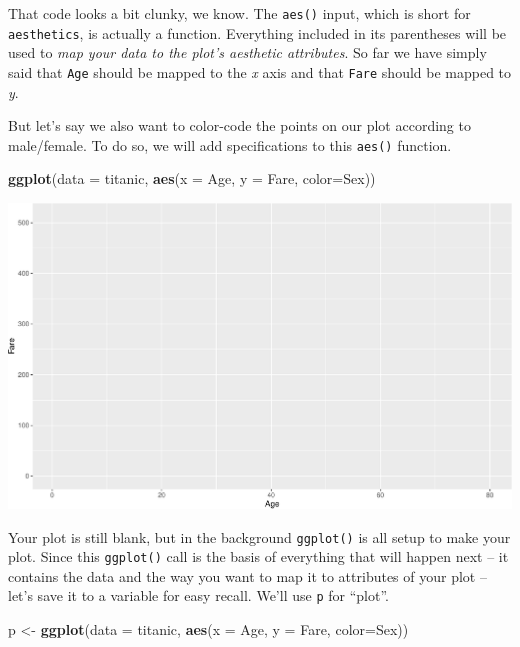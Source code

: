 \documentclass[]{book}
\newenvironment{Shaded}{\begin{snugshade}}{\end{snugshade}}
\newcommand{\DataTypeTok}[1]{\textcolor[rgb]{0.13,0.29,0.53}{#1}}
\newcommand{\KeywordTok}[1]{\textcolor[rgb]{0.13,0.29,0.53}{\textbf{#1}}}
\newcommand{\NormalTok}[1]{#1}
\newcommand{\StringTok}[1]{\textcolor[rgb]{0.31,0.60,0.02}{#1}}
\begin{document}
That code looks a bit clunky, we know. The \texttt{aes()} input, which is short for \texttt{aesthetics}, is actually a function. Everything included in its parentheses will be used to \emph{map your data to the plot's aesthetic attributes}. So far we have simply said that \texttt{Age} should be mapped to the \emph{x} axis and that \texttt{Fare} should be mapped to \emph{y}.

But let's say we also want to color-code the points on our plot according to male/female. To do so, we will add specifications to this \texttt{aes()} function.

\begin{Shaded}
\begin{Highlighting}[]
\KeywordTok{ggplot}\NormalTok{(}\DataTypeTok{data =}\NormalTok{ titanic, }
       \KeywordTok{aes}\NormalTok{(}\DataTypeTok{x =}\NormalTok{ Age, }\DataTypeTok{y =}\NormalTok{ Fare, }\DataTypeTok{color=}\NormalTok{Sex))}
\end{Highlighting}
\end{Shaded}

\includegraphics{figures/unnamed-chunk-249-1.pdf}

Your plot is still blank, but in the background \texttt{ggplot()} is all setup to make your plot. Since this \texttt{ggplot()} call is the basis of everything that will happen next -- it contains the data and the way you want to map it to attributes of your plot -- let's save it to a variable for easy recall. We'll use \texttt{p} for ``plot''.

\begin{Shaded}
\begin{Highlighting}[]
\NormalTok{p <-}\StringTok{ }\KeywordTok{ggplot}\NormalTok{(}\DataTypeTok{data =}\NormalTok{ titanic, }
       \KeywordTok{aes}\NormalTok{(}\DataTypeTok{x =}\NormalTok{ Age, }\DataTypeTok{y =}\NormalTok{ Fare, }\DataTypeTok{color=}\NormalTok{Sex))}
\end{Highlighting}
\end{Shaded}
\end{document}
